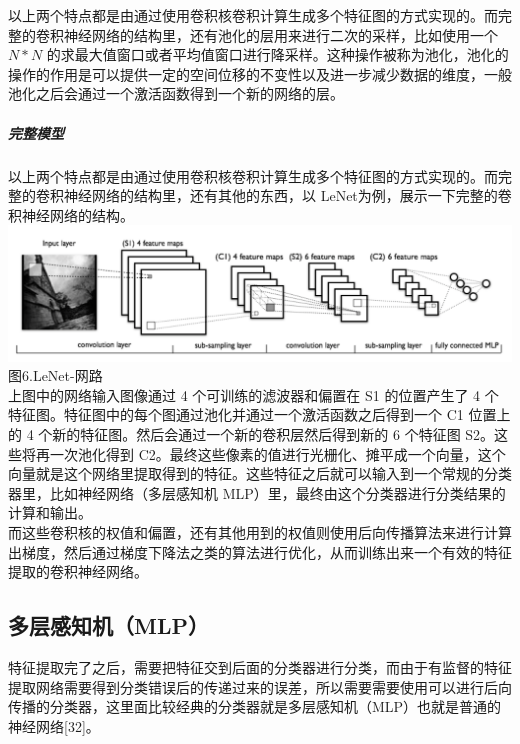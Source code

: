 以上两个特点都是由通过使用卷积核卷积计算生成多个特征图的方式实现的。而完整的卷积神经网络的结构里，还有池化的层用来进行二次的采样，比如使用一个
\(N*N\)
的求最大值窗口或者平均值窗口进行降采样。这种操作被称为池化，池化的操作的作用是可以提供一定的空间位移的不变性以及进一步减少数据的维度，一般池化之后会通过一个激活函数得到一个新的网络的层。

\subparagraph{完整模型}\label{ux5b8cux6574ux6a21ux578b}

以上两个特点都是由通过使用卷积核卷积计算生成多个特征图的方式实现的。而完整的卷积神经网络的结构里，还有其他的东西，以
LeNet为例，展示一下完整的卷积神经网络的结构。\\\includegraphics{picture/lenet.png}\\图6.LeNet-网路\\上图中的网络输入图像通过
4 个可训练的滤波器和偏置在 S1 的位置产生了 4
个特征图。特征图中的每个图通过池化并通过一个激活函数之后得到一个 C1
位置上的 4 个新的特征图。然后会通过一个新的卷积层然后得到新的 6 个特征图
S2。这些将再一次池化得到
C2。最终这些像素的值进行光栅化、摊平成一个向量，这个向量就是这个网络里提取得到的特征。这些特征之后就可以输入到一个常规的分类器里，比如神经网络（多层感知机
MLP）里，最终由这个分类器进行分类结果的计算和输出。\\而这些卷积核的权值和偏置，还有其他用到的权值则使用后向传播算法来进行计算出梯度，然后通过梯度下降法之类的算法进行优化，从而训练出来一个有效的特征提取的卷积神经网络。

\subsection{多层感知机（MLP）}\label{ux591aux5c42ux611fux77e5ux673amlp}

特征提取完了之后，需要把特征交到后面的分类器进行分类，而由于有监督的特征提取网络需要得到分类错误后的传递过来的误差，所以需要需要使用可以进行后向传播的分类器，这里面比较经典的分类器就是多层感知机（MLP）也就是普通的神经网络{[}32{]}。

